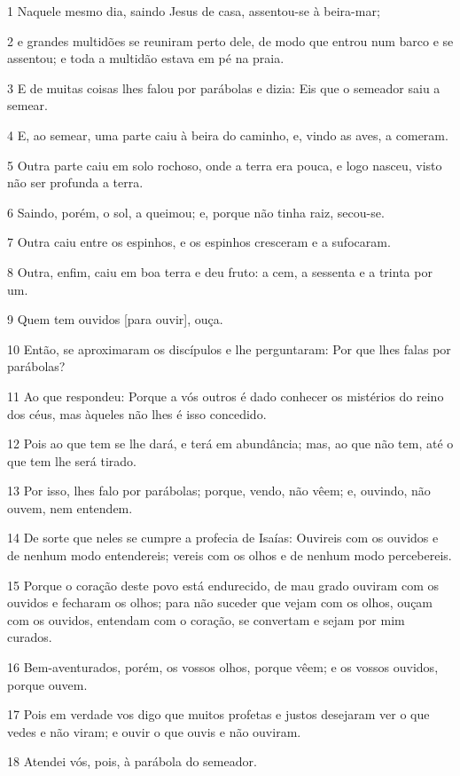 \par 1 Naquele mesmo dia, saindo Jesus de casa, assentou-se à beira-mar;
\par 2 e grandes multidões se reuniram perto dele, de modo que entrou num barco e se assentou; e toda a multidão estava em pé na praia.
\par 3 E de muitas coisas lhes falou por parábolas e dizia: Eis que o semeador saiu a semear.
\par 4 E, ao semear, uma parte caiu à beira do caminho, e, vindo as aves, a comeram.
\par 5 Outra parte caiu em solo rochoso, onde a terra era pouca, e logo nasceu, visto não ser profunda a terra.
\par 6 Saindo, porém, o sol, a queimou; e, porque não tinha raiz, secou-se.
\par 7 Outra caiu entre os espinhos, e os espinhos cresceram e a sufocaram.
\par 8 Outra, enfim, caiu em boa terra e deu fruto: a cem, a sessenta e a trinta por um.
\par 9 Quem tem ouvidos [para ouvir], ouça.
\par 10 Então, se aproximaram os discípulos e lhe perguntaram: Por que lhes falas por parábolas?
\par 11 Ao que respondeu: Porque a vós outros é dado conhecer os mistérios do reino dos céus, mas àqueles não lhes é isso concedido.
\par 12 Pois ao que tem se lhe dará, e terá em abundância; mas, ao que não tem, até o que tem lhe será tirado.
\par 13 Por isso, lhes falo por parábolas; porque, vendo, não vêem; e, ouvindo, não ouvem, nem entendem.
\par 14 De sorte que neles se cumpre a profecia de Isaías: Ouvireis com os ouvidos e de nenhum modo entendereis; vereis com os olhos e de nenhum modo percebereis.
\par 15 Porque o coração deste povo está endurecido, de mau grado ouviram com os ouvidos e fecharam os olhos; para não suceder que vejam com os olhos, ouçam com os ouvidos, entendam com o coração, se convertam e sejam por mim curados.
\par 16 Bem-aventurados, porém, os vossos olhos, porque vêem; e os vossos ouvidos, porque ouvem.
\par 17 Pois em verdade vos digo que muitos profetas e justos desejaram ver o que vedes e não viram; e ouvir o que ouvis e não ouviram.
\par 18 Atendei vós, pois, à parábola do semeador.

